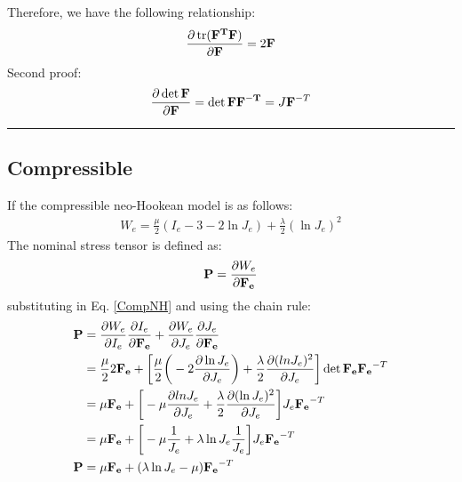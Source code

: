 \documentclass[12pt,3p]{article}
\numberwithin{equation}{section}
\begin{document}
Therefore, we have the following relationship: 
\begin{equation}\label{proof1}
\pdv{\trace(\mathbf{F^T} \mathbf{F})}{\mathbf{F}} = 2 \mathbf{F}
\end{equation}
Second proof: 
\begin{align*}
\pdv{\det \mathbf{F} }{\mathbf{F}} = \det \mathbf{F} \mathbf{F^{-T}} = J \mathbf{F}^{-T}
\end{align*}
\noindent\rule{19cm}{0.5pt} %

\subsection{Compressible}
If the compressible neo-Hookean model is as follows: 
\begin{align}\label{CompNH}
W_e = \frac{\mu}{2} (I_e - 3 - 2 \ln J_e) + \frac{\lambda}{2} (\ln J_e)^2
\end{align}
The nominal stress tensor is defined as: 
\begin{equation}\label{PW}
\mathbf{P} = \pdv{W_e}{\mathbf{F_e}} \\
\end{equation}
substituting in Eq. \ref{CompNH} and using the chain rule: 
\begin{align*}
\mathbf{P} &= \pdv{W_e}{I_e} \pdv{I_e}{\mathbf{F_e}} + \pdv{W_e}{J_e} \pdv{J_e}{\mathbf{F_e}} \\
&= \frac{\mu}{2} 2 \mathbf{F_e} + \bigg[ \frac{\mu}{2} \bigg( -2 \pdv{\ln J_e}{J_e}\bigg) + \frac{\lambda}{2} \pdv{(ln J_e)^2}{J_e} \bigg] \det \mathbf{F_e} \mathbf{F_e}^{-T} \\
&= \mu \mathbf{F_e} + \bigg[ - \mu \pdv{ln J_e}{J_e} + \frac{\lambda}{2} \pdv{(\ln J_e)^2}{J_e} \bigg] J_e \mathbf{F_e}^{-T} \\
&= \mu \mathbf{F_e} + \bigg[ - \mu \frac{1}{J_e} + \lambda \ln J_e \frac{1}{J_e} \bigg] J_e \mathbf{F_e}^{-T} \\
\mathbf{P} &= \mu \mathbf{F_e} + ( \lambda \ln J_e - \mu ) \mathbf{F_e}^{-T} 
\end{align*}

\end{document}

